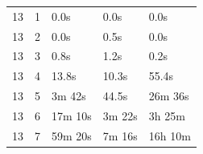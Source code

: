 \documentclass[a4paper,UKenglish,cleveref, autoref, thm-restate, anonymous]{lipics-v2021}
\begin{document}
\begin{table}[!t]
\begin{minipage}{\linewidth}
\begin{tabular}{c|c|l|l|l}
      \hline
      13  & 1   & 0.0s             & 0.0s              & 0.0s                                                                                                                                                                                                                                                                                    \\
      13  & 2   & 0.0s             & 0.5s              & 0.0s                                                                                                                                                                                                                                                                                    \\
      13  & 3   & 0.8s             & 1.2s              & 0.2s                                                                                                                                                                                                                                                                                    \\
      13  & 4   & 13.8s            & 10.3s             & 55.4s                                                                                                                                                                                                                                                                                   \\
      13  & 5   & 3m 42s           & 44.5s             & 26m 36s                                                                                                                                                                                                                                                                                 \\
      13  & 6   & 17m 10s          & 3m 22s            & 3h 25m                                                                                                                                                                                                                                                                                  \\
      13  & 7   & 59m 20s          & 7m 16s            & 16h 10m                                                                                                                                                                                                                                                                                 \\

\end{tabular}
\end{minipage}
\end{table}
\end{document}
